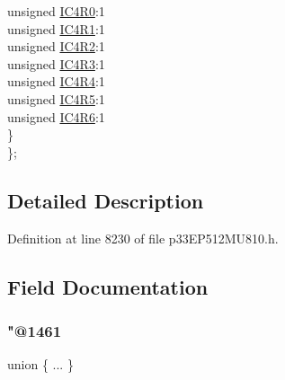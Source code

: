 \begin{DoxyCompactItemize}
\begin{tabbing}
\>\>unsigned \hyperlink{structtag_r_p_i_n_r8_b_i_t_s_a8acf6f02f8942d2e71eb4d70827edc5e}{IC4R0}:1\\
\>\>unsigned \hyperlink{structtag_r_p_i_n_r8_b_i_t_s_a39807d9fac0cfa7d8434ac2c4c2456db}{IC4R1}:1\\
\>\>unsigned \hyperlink{structtag_r_p_i_n_r8_b_i_t_s_a7ad73dc6050fb38d7cfb20364958cf7c}{IC4R2}:1\\
\>\>unsigned \hyperlink{structtag_r_p_i_n_r8_b_i_t_s_a302a81906ca41d2e8bbef5163c51d121}{IC4R3}:1\\
\>\>unsigned \hyperlink{structtag_r_p_i_n_r8_b_i_t_s_aebbbc5c70ecccdadc158c8b835397c95}{IC4R4}:1\\
\>\>unsigned \hyperlink{structtag_r_p_i_n_r8_b_i_t_s_a0846b33667eb59bda2c8303553514c93}{IC4R5}:1\\
\>\>unsigned \hyperlink{structtag_r_p_i_n_r8_b_i_t_s_a45265718eaf320567aa4f8898deaf594}{IC4R6}:1\\
\>\} \\
\}; \\

\end{tabbing}\end{DoxyCompactItemize}


\subsection{Detailed Description}


Definition at line 8230 of file p33\+E\+P512\+M\+U810.\+h.



\subsection{Field Documentation}
\mbox{\label{structtag_r_p_i_n_r8_b_i_t_s_aafb9688b3088702634d3ba8ee57d8a66}} 
\subsubsection{\texorpdfstring{"@1461}{@1461}}
{\footnotesize\ttfamily union \{ ... \} }

\mbox{\label{structtag_r_p_i_n_r8_b_i_t_s_adf71f3d8410c1f1dbbc96680a92c49af}} 
